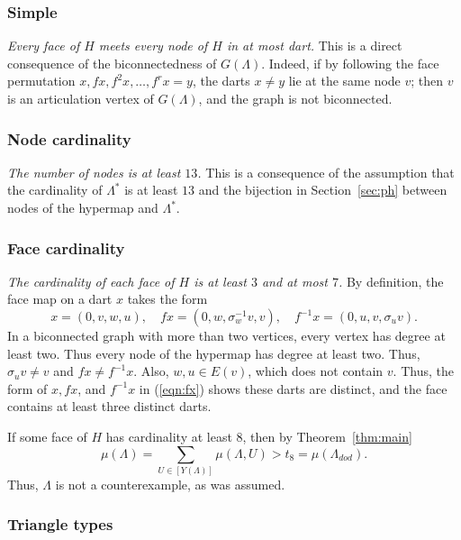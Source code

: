 \documentclass{article} %
\begin{document}
\subsubsection{Simple}

{\it Every face of $H$ meets every node of $H$ in at most
dart.}  This is a direct consequence of the biconnectedness of $G(\Lambda)$.
Indeed, if by following the face permutation $x,f x, f^2 x,\ldots, f^r x= y$,
the darts $x\ne y$ lie at the same node $v$; then $v$ is an articulation vertex
of $G(\Lambda)$, and the graph is not biconnected.

\subsubsection{Node cardinality}

{\it The number of nodes is at least $13$.}  This is a consequence of the assumption
that the cardinality of $\Lambda^*$ is at least $13$ and the bijection in
Section~\ref{sec:ph} between nodes of the hypermap and $\Lambda^*$.

\subsubsection{Face cardinality}\label{sec:face}

{\it The cardinality of each face of $H$ is at least $3$ and at most $7$.}
By  definition, the face map on a dart $x$ takes the form
\begin{equation}\label{eqn:fx}
x = (0,v,w,u),\quad
f x = (0,w,\sigma_w^{-1}v,v),\quad
f^{-1} x = (0,u,v,\sigma_u v).
\end{equation}
In a biconnected graph with more than two vertices,
every vertex has degree at least two.
Thus every node of the hypermap has degree
at least two.  Thus, $\sigma_u v\ne v$ and $f x\ne f^{-1} x$.
Also, $w,u\in E(v)$, which does not contain $v$.  Thus, 
the form of $x,fx$, and 
$f^{-1} x$
in (\ref{eqn:fx}) shows these darts are distinct, and
the
face contains at least three distinct darts.

If some face of $H$ has cardinality at least $8$, then by Theorem~\ref{thm:main}
$$
\mu(\Lambda) =\sum_{U\in [Y(\Lambda)]}\mu(\Lambda,U) > t_8 =\mu(\Lambda_{dod}).
$$
Thus, $\Lambda$ is not a counterexample, as was assumed.

\subsubsection{Triangle types}
\end{document}
